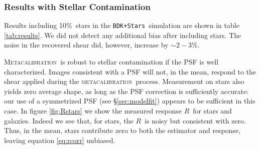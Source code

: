 \documentclass[iop]{emulateapj}
\newcommand{\snr}{$S/N$}
\newcommand{\mcal}{\textsc{metacalibration}}
\newcommand{\Mcal}{\textsc{Metacalibration}}
\newcommand{\mcalR}{\mbox{\boldmath $R$}}
\newcommand{\nsimNstarperc}{10\%}
\newcommand{\starnoiseincrease}{$\sim 2-3$\%}
\newcommand{\bdstar}{\texttt{BDK+Stars}}
\begin{document}

\subsubsection{Results with Stellar Contamination} \label{sec:stars}

Results including \nsimNstarperc\ stars in the \bdstar\ simulation are shown in
table \ref{tab:results}. We did not detect any additional bias after including
stars. The noise in the recovered shear did, however, increase by
\starnoiseincrease.

\Mcal\ is robust to stellar contamination if the PSF is well
characterized.  Images consistent with a PSF will not, in the mean, respond to the shear
applied during the \mcal\ process.  Measurement on stars also yields zero average shape, as
long as the PSF correction is sufficiently accurate: our use of a symmetrized
PSF (see \S \ref{sec:modelfit}) appears to be sufficient in this case.
In figure \ref{fig:Rstars} we show the measured response \mcalR\ for stars and
galaxies.  Indeed we see that, for stars, the \mcalR\ is noisy but consistent
with zero.  Thus, in the mean, stars contribute zero to both the estimator and
response, leaving equation \ref{eq:rcorr} unbiased.
\end{document}
